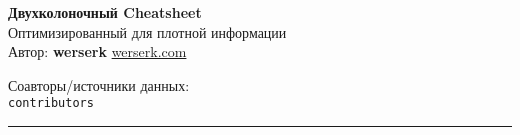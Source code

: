 \documentclass[10pt,landscape,a4paper]{article}
\begin{document}
\begin{center}
    {\Huge\bfseries Двухколоночный Cheatsheet}\\[0.5cm]
    {\large Оптимизированный для плотной информации}\\[0.3cm]
    \vspace{0.2cm}
    {\small Автор: {\bfseries werserk} \textbar{} \href{https://werserk.com}{werserk.com}}
    \par\vspace{0.1cm}
    {\small Соавторы/источники данных: \texttt{\\contributors}}
    \par\vspace{0.3cm}
    \rule{\textwidth}{1pt}
\end{center}

\providecommand{\contributors}{}
\end{document}
